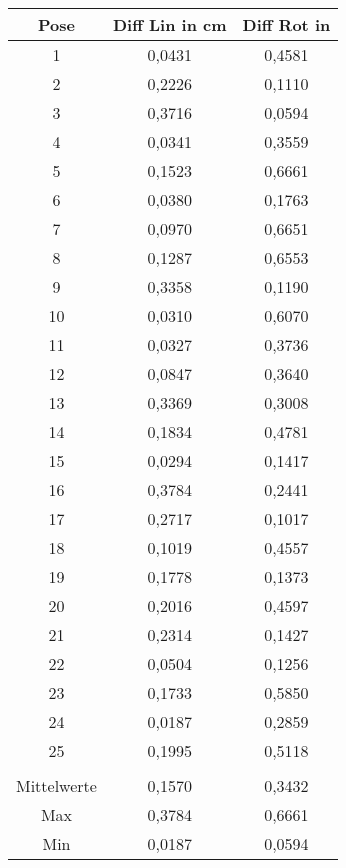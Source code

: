 \begin{appendix}
    \begin{tabular}{|c|c|c|}
    	\hline
    	Pose&Diff Lin in cm&Diff Rot in \textdegree \\
    	    	\hline
    	1&0,0431&0,4581\\
    	    	\hline
    	2&0,2226&0,1110\\
    	    	\hline
    	3&0,3716&0,0594\\
    	    	\hline
    	4&0,0341&0,3559\\
    	    	\hline
    	5&0,1523&0,6661\\
    	    	\hline
    	6&0,0380&0,1763\\    	\hline
    	7&0,0970&0,6651\\    	\hline
    	8&0,1287&0,6553\\    	\hline
    	9&0,3358&0,1190\\    	\hline
    	10&0,0310&0,6070\\    	\hline
    	11&0,0327&0,3736\\    	\hline
    	12&0,0847&0,3640\\    	\hline
    	13&0,3369&0,3008\\    	\hline
    	14&0,1834&0,4781\\    	\hline
    	15&0,0294&0,1417\\    	\hline
    	16&0,3784&0,2441\\    	\hline
    	17&0,2717&0,1017\\    	\hline
    	18&0,1019&0,4557\\    	\hline
    	19&0,1778&0,1373\\    	\hline
    	20&0,2016&0,4597\\    	\hline
    	21&0,2314&0,1427\\    	\hline
    	22&0,0504&0,1256\\    	\hline
    	23&0,1733&0,5850\\    	\hline
    	24&0,0187&0,2859\\    	\hline
    	25&0,1995&0,5118\\    	\hline
    	\\    	\hline
    	Mittelwerte&0,1570&0,3432\\    	\hline
    	Max&0,3784&0,6661\\    	\hline
    	Min&0,0187&0,0594\\    	\hline
    	
    	
    \end{tabular} 
    

\end{appendix}
